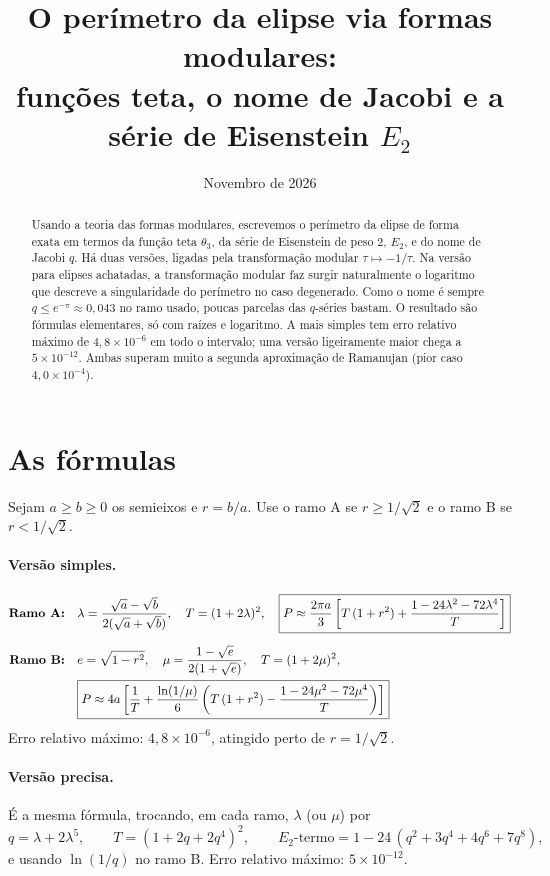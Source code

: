 \documentclass[11pt,a4paper]{article}
\title{O perímetro da elipse via formas modulares:\\ funções teta, o nome de Jacobi e a série de Eisenstein \texorpdfstring{$E_2$}{E2}}
\author{}
\date{Novembro de 2026}
\theoremstyle{remark}
\begin{document}
\maketitle

\begin{abstract}
Usando a teoria das formas modulares, escrevemos o perímetro da elipse de forma
exata em termos da função teta $\theta_3$, da série de Eisenstein de peso 2,
$E_2$, e do nome de Jacobi $q$. Há duas versões, ligadas pela transformação
modular $\tau\mapsto-1/\tau$. Na versão para elipses achatadas, a transformação
modular faz surgir naturalmente o logaritmo que descreve a singularidade do
perímetro no caso degenerado. Como o nome é sempre $q\le e^{-\pi}\approx0{,}043$
no ramo usado, poucas parcelas das $q$-séries bastam. O resultado são fórmulas elementares,
só com raízes e logaritmo. A mais simples tem erro relativo máximo de $4{,}8\times10^{-6}$
em todo o intervalo; uma versão ligeiramente maior chega a $5\times10^{-12}$. Ambas
superam muito a segunda aproximação de Ramanujan (pior caso $4{,}0\times10^{-4}$).
\end{abstract}

\section{As fórmulas}

Sejam $a\ge b\ge0$ os semieixos e $r=b/a$. Use o ramo A se $r\ge1/\sqrt2$ e o
ramo B se $r<1/\sqrt2$.

\paragraph{Versão simples.}
\begin{align}
\textbf{Ramo A:}\quad &\lambda=\frac{\sqrt a-\sqrt b}{2(\sqrt a+\sqrt b)},\quad
T=(1+2\lambda)^2,\quad
\boxed{P\approx\frac{2\pi a}{3}\left[T\,(1+r^2)+\frac{1-24\lambda^2-72\lambda^4}{T}\right]}
\label{eq:A}\\[6pt]
\textbf{Ramo B:}\quad &e=\sqrt{1-r^2},\quad \mu=\frac{1-\sqrt e}{2(1+\sqrt e)},\quad T=(1+2\mu)^2,\notag\\
&\boxed{P\approx4a\left[\frac1T+\frac{\ln(1/\mu)}{6}\left(T\,(1+r^2)-\frac{1-24\mu^2-72\mu^4}{T}\right)\right]}
\label{eq:B}
\end{align}
Erro relativo máximo: $4{,}8\times10^{-6}$, atingido perto de $r=1/\sqrt2$.

\paragraph{Versão precisa.} É a mesma fórmula, trocando, em cada ramo, $\lambda$ (ou $\mu$) por
\begin{equation}\label{eq:precisa}
q=\lambda+2\lambda^5,\qquad
T=(1+2q+2q^4)^2,\qquad
E_2\text{-termo}=1-24\,(q^2+3q^4+4q^6+7q^8),
\end{equation}
e usando $\ln(1/q)$ no ramo B. Erro relativo máximo: $5\times10^{-12}$.
\end{document}

